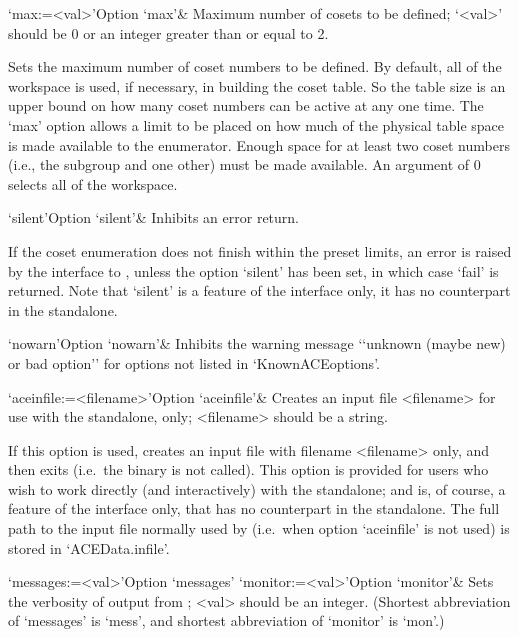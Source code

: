 \>`max:=<val>'{Option `max'}&
Maximum number of cosets to be defined;
`<val>' should be $0$ or an integer greater than or equal to 2.

Sets the maximum  number of coset numbers to  be defined.  By default,
all  of the workspace  is used,  if necessary,  in building  the coset
table.  So the table size is  an upper bound on how many coset numbers
can be active at any one time.   The `max' option allows a limit to be
placed on  how much of the  physical table space is  made available to
the enumerator.   Enough space for  at least two coset  numbers (i.e.,
the subgroup and one other) must  be made available.  An argument of 0
selects all of the workspace.

\enditems



\beginitems

\>`silent'{Option `silent'}& 
Inhibits an error return.

If the coset enumeration does not finish within the preset limits,  an
error is raised by the interface to {\GAP}, unless the option `silent'
has been set, in which case `fail' is returned. Note that `silent'  is
a feature of the {\GAP} interface only, it has no counterpart  in  the
{\ACE} standalone.

\>`nowarn'{Option `nowarn'}& 
Inhibits the warning message \lq{}`unknown (maybe new) or bad option''
for options not listed in `KnownACEoptions'.

\>`aceinfile:=<filename>'{Option `aceinfile'}&
Creates an {\ACE} input file <filename> for use with  the  standalone,
only; <filename> should be a string.

If this option is used, {\GAP} creates an  input  file  with  filename
<filename> only,  and  then  exits  (i.e.~the  {\ACE}  binary  is  not
called). This option is provided for users who wish to  work  directly
(and interactively) with the {\ACE} standalone; and is, of  course,  a
feature of the interface only, that has no counterpart in  the  {\ACE}
standalone. The full path to the input file normally  used  by  {\ACE}
(i.e.~when  option   `aceinfile'   is   not   used)   is   stored   in
`ACEData.infile'.

\>`messages:=<val>'{Option `messages'}
\>`monitor:=<val>'{Option `monitor'}&
Sets the verbosity of output from {\ACE}; <val> should be an integer.
(Shortest  abbreviation  of  `messages'  is   `mess',   and   shortest
abbreviation of `monitor' is `mon'.)

